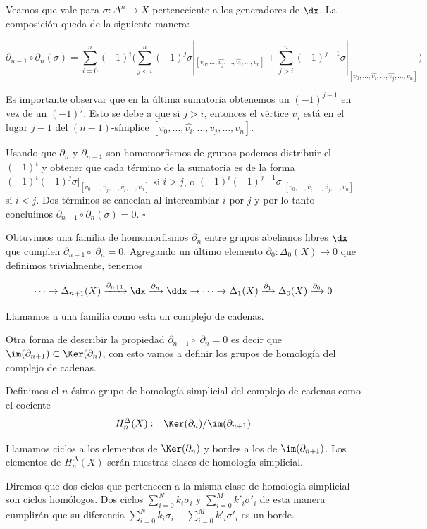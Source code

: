 \begin{dem}
Veamos que vale para $\sigma:\Delta^n\to X$ perteneciente a los generadores de $\dx$. La composición queda de la siguiente manera: 

$$\partial_{n-1}\circ\partial_n(\sigma)=\sum\limits_{i=0}^n(-1)^i\bigg(\sum\limits_{j<i}^n (-1)^j\sigma|_{[v_0,\dots,\hat{v_j},\dots,\hat{v_i},\dots,v_n]} + \sum\limits_{j>i}^n (-1)^{j-1}\sigma|_{[v_0,\dots,\hat{v_i},\dots,\hat{v_j},\dots,v_n]}\bigg)$$

Es importante observar que en la última sumatoria obtenemos un $(-1)^{j-1}$ en vez de un $(-1)^j$. Esto se debe a que si $j>i$, entonces el vértice $v_j$ está en el lugar $j-1$ del $(n-1)$-símplice $[v_0,\dots,\hat{v_i},\dots,v_j,\dots, v_n]$.

Usando que $\partial_n$ y $\partial_{n-1}$ son homomorfismos de grupos podemos distribuir el $(-1)^i$ y obtener que cada término de la sumatoria es de la forma $(-1)^i(-1)^j\sigma|_{[v_0,\dots,\hat{v_j},\dots,\hat{v_i},\dots,v_n]}$ si $i>j$, o $(-1)^i(-1)^{j-1}\sigma|_{[v_0,\dots,\hat{v_i},\dots,\hat{v_j},\dots,v_n]}$ si $i<j$. Dos términos se cancelan al intercambiar $i$ por $j$ y por lo tanto concluimos $\partial_{n-1}\circ\partial_n(\sigma)=0$. $\square$

\end{dem}

\begin{df}
    
Obtuvimos una familia de homomorfismos $\partial_n$ entre grupos abelianos libres $\dx$ que cumplen $\partial_{n-1}\circ\;\partial_n= 0$. Agregando un último elemento $\partial_0:\Delta_0(X)\to 0$ que definimos trivialmente, tenemos 

$$\dots\rightarrow \Delta_{n+1}(X)\xrightarrow{\partial_{n+1}}\dx\xrightarrow{\partial_n}\ddx\rightarrow\dots\rightarrow\Delta_{1}(X)\xrightarrow{\partial_1}\Delta_{0}(X)\xrightarrow{\partial_0} 0$$\br

Llamamos a una familia como esta un complejo de cadenas.

\end{df}\br

Otra forma de describir la propiedad $\partial_{n-1}\circ\;\partial_n=0$ es decir que $\im(\partial_{n+1})\subset\Ker(\partial_n)$, con esto vamos a definir los grupos de homología del complejo de cadenas.\br

\begin{df}

Definimos el $n$-ésimo grupo de homología simplicial del complejo de cadenas como el cociente $$H_n^{\Delta}(X):=\Ker(\partial_n)/\im(\partial_{n+1})$$\br

Llamamos ciclos a los elementos de $\Ker(\partial_n)$ y bordes a los de $\im(\partial_{n+1})$. Los elementos de $H_n^{\Delta}(X)$ serán nuestras clases de homología simplicial.\br 

Diremos que dos ciclos que pertenecen a la misma clase de homología simplicial son ciclos homólogos. Dos ciclos $\sum_{i=0}^N k_i\sigma_i$ y $\sum_{i=0}^M k'_i\sigma'_i$ de esta manera cumplirán que su diferencia $\sum_{i=0}^N k_i\sigma_i - \sum_{i=0}^M k'_i\sigma'_i$ es un borde.\br

\end{df}

